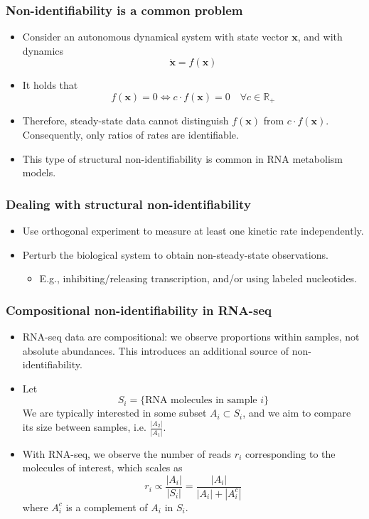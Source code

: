 \documentclass{beamer}
\begin{document}
\begin{frame}
	\frametitle{Non-identifiability is a common problem}
	\pause
	\begin{itemize}
		\item Consider an autonomous dynamical system with state vector $\boldsymbol{x}$, and with dynamics
		$$
		\dot{\boldsymbol{x}} = f(\boldsymbol{x})
		$$
		\pause
		\item It holds that
		$$	
		f(\boldsymbol{x}) = 0 \Leftrightarrow c \cdot f(\boldsymbol{x}) = 0 \quad  \forall c \in \mathbb{R}_+
		$$
		\pause 
		\item Therefore, steady-state data cannot distinguish $f(\boldsymbol{x})$ from $c \cdot f(\boldsymbol{x})$.  
		Consequently, only ratios of rates are identifiable.
		\pause
		\item This type of structural non-identifiability is common in RNA metabolism models.
	\end{itemize}
	
\end{frame}

\begin{frame}
	\frametitle{Dealing with structural non-identifiability}
	\pause
	\begin{itemize}
		\item Use orthogonal experiment to measure at least one kinetic rate independently.
		\pause
		\item Perturb the biological system to obtain non-steady-state observations.
		\pause
		\begin{itemize}
			\item E.g., inhibiting/releasing transcription, and/or using labeled nucleotides. 
		\end{itemize}
	
	\end{itemize} 
	
	
\end{frame}


\begin{frame}
	\frametitle{Compositional non-identifiability in RNA-seq}
	\pause
	\begin{itemize}
		\item RNA-seq data are compositional: we observe proportions within samples, not absolute abundances. This introduces an additional source of non-identifiability. \pause
	 \item Let
	 $$
	 S_i = \{ \text{RNA molecules in sample } i\}
	 $$
	 We are typically interested in some subset $A_i \subset S_i$, and we aim to compare its size between samples, i.e. $\frac{|A_2|}{|A_1|}$.
	 \pause
	 \item With RNA-seq, we observe the number of reads $r_i$ corresponding to the molecules of interest, which scales as
	 $$
	 r_i \propto \frac{|A_i|}{|S_i|} = \frac{|A_i|}{|A_i|+|A_i^c|}
	 $$
	 where $A^c_i$ is a complement of $A_i$ in $S_i$.
	 \end{itemize}	
\end{frame}
\end{document}
